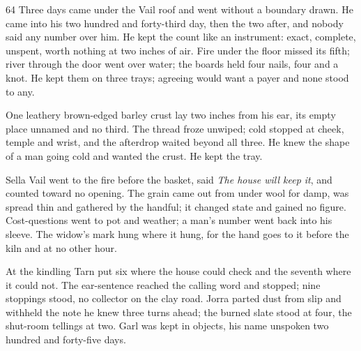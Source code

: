 
\scenebreak


\scenebreak


\scenebreak

\CRtailpiece
\begin{CRchronicle}{64}
Three days came under the Vail roof and went without a boundary drawn. He came into his two hundred and forty-third day, then the two after, and nobody said any number over him. He kept the count like an instrument: exact, complete, unspent, worth nothing at two inches of air. Fire under the floor missed its fifth; river through the door went over water; the boards held four nails, four and a knot. He kept them on three trays; agreeing would want a payer and none stood to any.

One leathery brown-edged barley crust lay two inches from his ear, its empty place unnamed and no third. The thread froze unwiped; cold stopped at cheek, temple and wrist, and the afterdrop waited beyond all three. He knew the shape of a man going cold and wanted the crust. He kept the tray.

Sella Vail went to the fire before the basket, said \emph{The house will keep it}, and counted toward no opening. The grain came out from under wool for damp, was spread thin and gathered by the handful; it changed state and gained no figure. Cost-questions went to pot and weather; a man’s number went back into his sleeve. The widow’s mark hung where it hung, for the hand goes to it before the kiln and at no other hour.

At the kindling Tarn put six where the house could check and the seventh where it could not. The ear-sentence reached the calling word and stopped; nine stoppings stood, no collector on the clay road. Jorra parted dust from slip and withheld the note he knew three turns ahead; the burned slate stood at four, the shut-room tellings at two. Garl was kept in objects, his name unspoken two hundred and forty-five days.


\end{CRchronicle}
